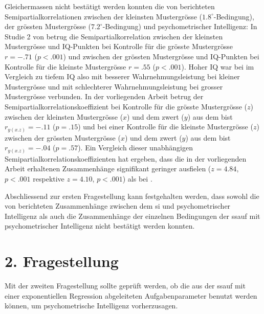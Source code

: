 \documentclass[11pt, twoside, a4paper]{book}		%
\begin{document}
Gleichermassen nicht bestätigt werden konnten die von \citet{Melnick2013} berichteten Semipartialkorrelationen zwischen der kleinsten Mustergrösse ($1.8^{\circ}$-Bedingung), der grössten Mustergrösse ($7.2^{\circ}$-Bedingung) und psychometrischer Intelligenz: In Studie 2 von \citeauthor{Melnick2013} betrug die Semipartialkorrelation zwischen der kleinsten Mustergrösse und IQ-Punkten bei Kontrolle für die grösste Mustergrösse $r=-.71$ ($p<.001$) und zwischen der grössten Mustergrösse und IQ-Punkten bei Kontrolle für die kleinste Mustergrösse $r=.55$ ($p<.001$). Hoher IQ war bei \citeauthor{Melnick2013} im Vergleich zu tiefem IQ also mit besserer Wahrnehmungsleistung bei kleiner Mustergrösse und mit schlechterer Wahrnehmungsleistung bei grosser Mustergrösse verbunden. 
In der vorliegenden Arbeit betrug der Semipartialkorrelationskoeffizient bei Kontrolle für die grösste Mustergrösse ($z$) zwischen der kleinsten Mustergrösse ($x$) und dem \gls{zwert} ($y$) aus dem \gls{bist} $r_{y(x.z)}= -.11$ ($p = .15$) und bei einer Kontrolle für die kleinste Mustergrösse ($z$) zwischen der grössten Mustergrösse ($x$) und dem \gls{zwert} ($y$) aus dem \gls{bist} $r_{y(x.z)}=-.04$ ($p = .57$). 
Ein Vergleich dieser unabhängigen Semipartialkorrelationskoeffizienten hat ergeben, dass die in der vorliegenden Arbeit erhaltenen Zusammenhänge signifikant geringer ausfielen ($z=4.84$, $p<.001$ respektive $z=4.10$, $p<.001$) als bei \citeauthor{Melnick2013}.

Abschliessend zur ersten Fragestellung kann festgehalten werden, dass sowohl die von \citet{Melnick2013} berichteten Zusammenhänge zwischen dem \gls{si} und psychometrischer Intelligenz als auch die Zusammenhänge der einzelnen Bedingungen der \gls{ssauf} mit psychometrischer Intelligenz nicht bestätigt werden konnten.













\section{2. Fragestellung \label{sec:2Fragestellung}}


Mit der zweiten Fragestellung sollte geprüft werden, ob die aus der \gls{ssauf} mit einer exponentiellen Regression abgeleiteten Aufgabenparameter benutzt werden können, um psychometrische Intelligenz vorherzusagen.
\end{document}

